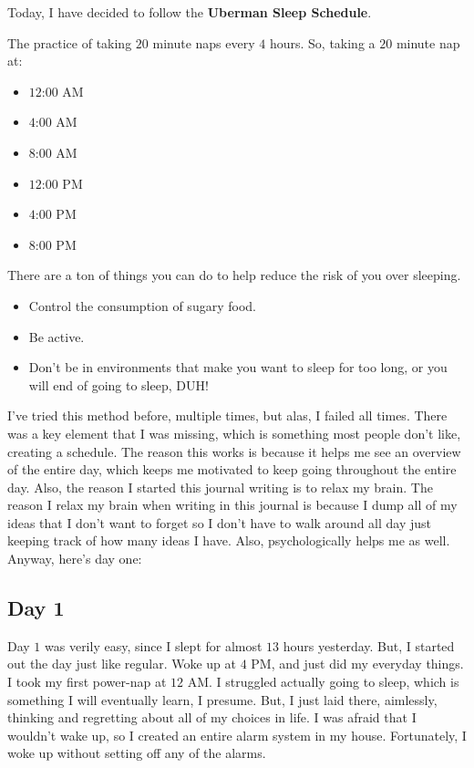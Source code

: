Today, I have decided to follow the \textbf{Uberman Sleep Schedule}.

\begin{mydefinition}
  \label{def:uberman_sleep_schedule}

  The practice of taking $20$ minute naps every $4$ hours. So, taking a $20$ 
  minute nap at:
  \begin{itemize}
    \label{item:when_to_take_a_nap}

    \item $12$:$00$ AM
    \item $4$:$00$ AM
    \item $8$:$00$ AM
    \item $12$:$00$ PM
    \item $4$:$00$ PM
    \item $8$:$00$ PM
  \end{itemize}
\end{mydefinition}

There are a ton of things you can do to help reduce the risk of you over
sleeping.
\begin{itemize}
  \label{item:things_that_can_reduce_your_risk_of_over_sleeping}

  \item Control the consumption of sugary food.
  \item Be active.
  \item Don't be in environments that make you want to sleep for too long, or
    you will end of going to sleep, DUH!
\end{itemize}
I've tried this method before, multiple times, but alas, I failed all times.
There was a key element that I was missing, which is something most people
don't like, creating a schedule. The reason this works is because it helps me
see an overview of the entire day, which keeps me motivated to keep going
throughout the entire day. Also, the reason I started this journal writing is
to relax my brain. The reason I relax my brain when writing in this journal is
because I dump all of my ideas that I don't want to forget so I don't have to
walk around all day just keeping track of how many ideas I have. Also,
psychologically helps me as well. Anyway, here's day one:

\subsection*{Day 1}
\label{sub_sec:day_1}

Day $1$ was verily easy, since I slept for almost $13$ hours yesterday. But, I
started out the day just like regular. Woke up at $4$ PM, and just did my
everyday things. I took my first power-nap at $12$ AM. I struggled actually
going to sleep, which is something I will eventually learn, I presume. But, I
just laid there, aimlessly, thinking and regretting about all of my choices in
life. I was afraid that I wouldn't wake up, so I created an entire alarm system
in my house. Fortunately, I woke up without setting off any of the alarms.

